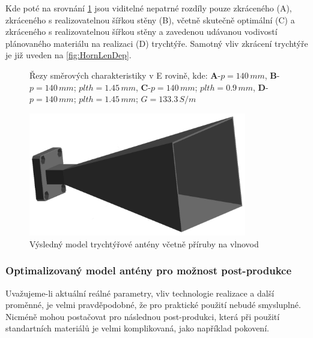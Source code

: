 Kde poté na srovnání \ref{fig:hornCompare} jsou viditelné nepatrné rozdíly pouze zkráceného (A), zkráceného s realizovatelnou šířkou stěny (B), včetně skutečně optimální (C) a zkráceného s realizovatelnou šířkou stěny a zavedenou udávanou vodivostí plánovaného materiálu na realizaci (D) trychtýře. Samotný vliv zkrácení trychtýře je již uveden na \ref{fig:HornLenDep}.

\begin{figure}
\caption{Řezy směrových charakteristiky v E rovině, kde: \textbf{A}-$p=140\,mm$, \textbf{B}-$p=140\,mm$; $plth=1.45\,mm$, \textbf{C}-$p=140\,mm$; $plth=0.9\,mm$, \textbf{D}-$p=140\,mm$; $plth=1.45\,mm$; $G=133.3\,S/m$}
\label{fig:hornCompare}
\end{figure}

\begin{figure}[h]
\begin{center}
\includegraphics[width=9.5cm]{pics/HornFinal}
\caption{Výsledný model trychtýřové antény včetně příruby na vlnovod}
\label{fig:HornFinal}
\end{center}
\end{figure}

\subsubsection{Optimalizovaný model antény pro možnost post-produkce}
Uvažujeme-li aktuální reálné parametry, vliv technologie realizace a další proměnné, je velmi pravděpodobné, že pro praktické použití nebudé smysluplné. Nicméně mohou postačovat pro následnou post-produkci, která při použití standartních materiálů je velmi komplikovaná, jako například pokovení.

